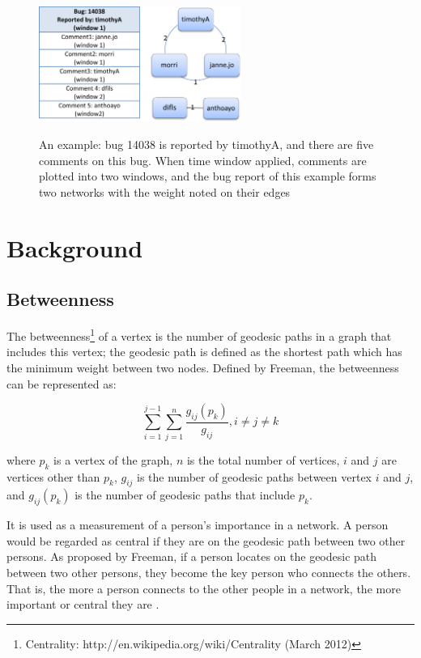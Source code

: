 \documentclass[10pt, conference, compsocconf]{IEEEtran}
\begin{document}

\begin{figure}[!t]
\centerline{\includegraphics[width=2.6in,height = 3.8cm]{graph.png}
\label{graph}}
\caption{An example: bug 14038 is reported by timothyA, and there are
  five comments on this bug. 
When time window applied, comments are plotted into two windows, and
the bug report of this example forms two networks with the weight
noted on their edges}

\end{figure}

\section{Background}
\label{background}
\subsection{Betweenness}

The betweenness\footnote[2]{Centrality:
  http://en.wikipedia.org/wiki/Centrality (March 2012)} of a vertex is the number of geodesic paths in a graph that includes this vertex; the geodesic path is defined as the shortest path which has the minimum weight between two nodes. 
Defined by Freeman, the betweenness can be represented as:

\begin{equation} 
\sum_{i=1}^{j-1}\sum_{j=1}^{n}\frac{g_{ij}(p_k)}{g_{ij}}, i\neq j \neq k
\end{equation}

where $p_k$ is a vertex of the graph, $n$ is the total number of vertices, $i$ and $j$ are vertices other than $p_k$, $g_{ij}$ is the number of geodesic paths between vertex $i$ and $j$, and $g_{ij}(p_k)$ is the number of geodesic paths that include $p_k$.

It is used as a measurement of a person's importance in a network. A person would be regarded as central if they are on the geodesic path between two other persons. As proposed by Freeman, if a person locates on the geodesic path between two other persons, they become the key person who connects the others. That is, the more a person connects to the other people in a network, the more important or central they are \cite{BOOK:han}.
\end{document}
